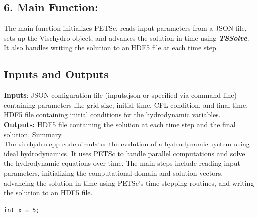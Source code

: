 \documentclass{article}
\begin{document}
\subsection{6. Main Function:
}
The main function initializes PETSc, reads input parameters from a JSON file, sets up the Vischydro object, and advances the solution in time using \textbf{\textit{TSSolve}}.
It also handles writing the solution to an HDF5 file at each time step.
\subsection{Inputs and Outputs
}\textbf{Inputs}: JSON configuration file (inputs.json or specified via command line) containing parameters like grid size, initial time, CFL condition, and final time.
HDF5 file containing initial conditions for the hydrodynamic variables.\\
\textbf{Outputs:} HDF5 file containing the solution at each time step and the final solution.
Summary\\

The vischydro.cpp code simulates the evolution of a hydrodynamic system using ideal hydrodynamics. It uses PETSc to handle parallel computations and solve the hydrodynamic equations over time. The main steps include reading input parameters, initializing the computational domain and solution vectors, advancing the solution in time using PETSc's time-stepping routines, and writing the solution to an HDF5 file.

\lstinline|int x = 5;|
\end{document}
